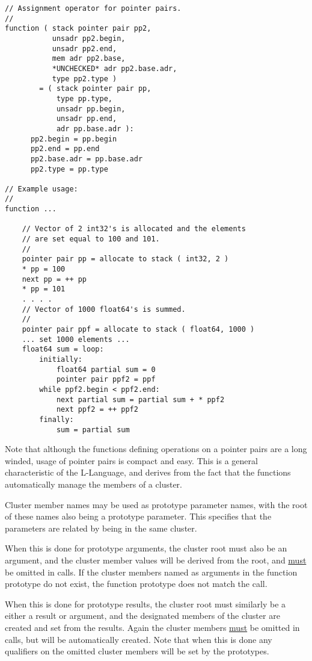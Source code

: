 \documentclass[12pt]{article}
\newenvironment{indpar}[1][0.3in]%
	{\begin{list}{}%
		     {\setlength{\itemsep}{0in}%
		      \setlength{\topsep}{0in}%
		      \setlength{\parsep}{1ex}%
		      \setlength{\labelwidth}{#1}%
		      \setlength{\leftmargin}{#1}%
		      \addtolength{\leftmargin}{\labelsep}}%
	 \item}%
	{\end{list}}
\begin{document}
\begin{indpar}
\begin{verbatim}
// Assignment operator for pointer pairs.
//
function ( stack pointer pair pp2,
           unsadr pp2.begin,
           unsadr pp2.end,
           mem adr pp2.base,
           *UNCHECKED* adr pp2.base.adr,
           type pp2.type )
        = ( stack pointer pair pp,
            type pp.type,
            unsadr pp.begin,
            unsadr pp.end,
            adr pp.base.adr ):
      pp2.begin = pp.begin
      pp2.end = pp.end
      pp2.base.adr = pp.base.adr
      pp2.type = pp.type

// Example usage:
//
function ...

    // Vector of 2 int32's is allocated and the elements
    // are set equal to 100 and 101.
    //
    pointer pair pp = allocate to stack ( int32, 2 )
    * pp = 100
    next pp = ++ pp
    * pp = 101
    . . . .
    // Vector of 1000 float64's is summed.
    //
    pointer pair ppf = allocate to stack ( float64, 1000 )
    ... set 1000 elements ...
    float64 sum = loop:
        initially:
            float64 partial sum = 0
            pointer pair ppf2 = ppf
        while ppf2.begin < ppf2.end:
            next partial sum = partial sum + * ppf2
            next ppf2 = ++ ppf2
        finally:
            sum = partial sum
\end{verbatim}\end{indpar}\label{NEXT-CLUSTER-BASE-EXAMPLE}

Note that although the functions defining operations on a pointer pairs
are a long winded, usage of pointer pairs is compact and easy.
This is a general characteristic of the L-Language, and derives
from the fact that the functions automatically manage the members
of a cluster.

Cluster member names may be used as prototype parameter
names, with the root of these names also being a prototype
parameter.  This specifies that the parameters are related
by being in the same cluster.

When this is done for prototype arguments, the cluster root must
also be an argument, and the cluster member values
will be derived from the root, and \underline{must}
be omitted in calls.  If the cluster members named as arguments
in the function prototype do not exist,
the function prototype does not match the call.

When this is done for prototype results, the cluster root must similarly
be a either a result or argument, and the designated
members of the cluster are created and set from the results.
Again the cluster members \underline{must} be omitted in calls,
but will be automatically created.
Note that when this is done any qualifiers on the omitted cluster
members will be set by the prototypes.
\end{document}
